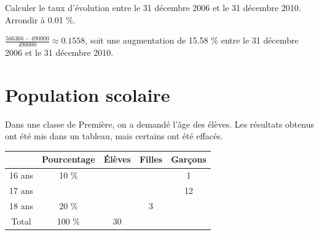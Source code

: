 \documentclass[a4paper,11pt]{exam}
\begin{document}
\begin{questions}
\begin{solution}
\begin{tabular}{|c|c|c|}
		\end{tabular}
	\end{solution}
	
	
	\question Calculer le taux d'évolution entre le 31 décembre 2006 et le 31 décembre 2010. Arrondir à \num{0.01} \%.
	\begin{solution}
		$\frac{\num{566366}-\num{490000}}{\num{490000}}\approx \num{0.1558}$, soit une augmentation de \num{15.58} \% entre le 31 décembre 2006 et le 31 décembre 2010.
	\end{solution}
	
	
\end{questions}

\section{Population scolaire}

Dans une classe de Première, on a demandé l'âge des élèves. Les résultats obtenus ont été mis dans un tableau, mais certains ont été effacés.

\begin{center}
	\begin{tabular}{@{\ }c@{\ }|@{\ }c@{\ }|@{\ }c@{\ }|@{\ }c@{\ }|@{\ }c@{\ }|}
		\cline{2-5}
		& Pourcentage & \'Elèves & Filles & Garçons \\ \hline
		\multicolumn{1}{|c|}{16 ans} & \num{10} \% &  &   & \num{1}  \\ \hline
		\multicolumn{1}{|c|}{17 ans} &                                  &                               &                             & 12                           \\ \hline
		\multicolumn{1}{|c|}{18 ans} & \num{20} \%   &   & 3 &   \\ \hline
		\multicolumn{1}{|c|}{Total}  & \num{100} \% & \num{30}  &   & \\ \hline
	\end{tabular}	
\end{center}
\end{document}
